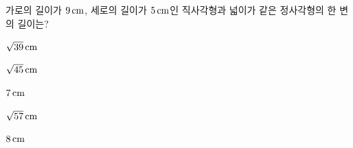 가로의 길이가 $9\mkern3mu \mathrm{cm}$, 세로의 길이가 $5\mkern3mu \mathrm{cm}$인 직사각형과 넓이가 같은 정사각형의 한 변의 길이는?
\begin{choices32}{\rule[-3ex]{0pt}{8ex}$\sqrt{39}\mkern3mu \mathrm{cm}$}{\rule[-3ex]{0pt}{8ex}$\sqrt{45}\mkern3mu \mathrm{cm}$}{\rule[-3ex]{0pt}{8ex}$7\mkern3mu \mathrm{cm}$}{\rule[-3ex]{0pt}{8ex}$\sqrt{57}\mkern3mu \mathrm{cm}$}{\rule[-3ex]{0pt}{8ex}$8\mkern3mu \mathrm{cm}$}\end{choices32}
